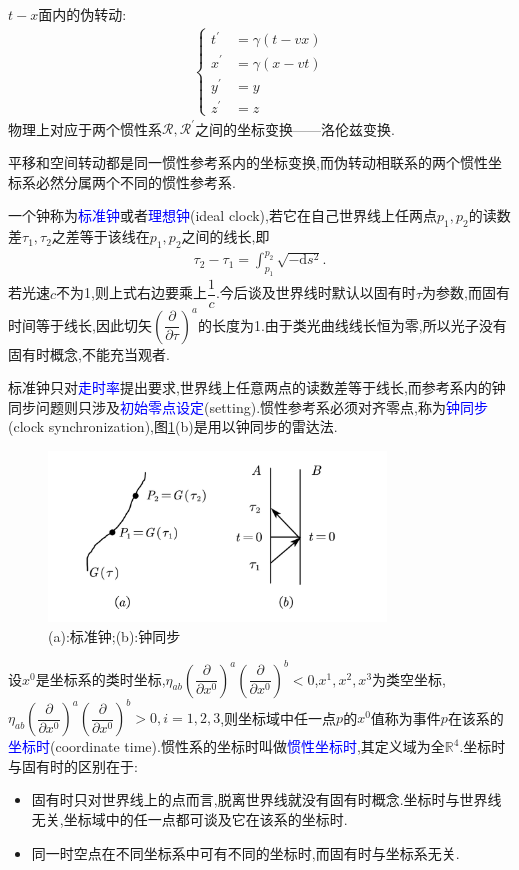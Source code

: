 \begin{enumerate}
$t-x$面内的伪转动:
\begin{align}
\left\{
\begin{aligned}
t^\prime &=\gamma(t-vx)\\
x^\prime&=\gamma(x-vt)\\
y^\prime&=y\\
z^\prime &=z
\end{aligned}
\right.
\end{align}
物理上对应于两个惯性系$\mathscr{R},\mathscr{R}^\prime$之间的坐标变换——洛伦兹变换.
\end{enumerate}

平移和空间转动都是同一惯性参考系内的坐标变换,而伪转动相联系的两个惯性坐标系必然分属两个不同的惯性参考系.

一个钟称为\textcolor{blue}{标准钟}或者\textcolor{blue}{理想钟}(ideal clock),若它在自己世界线上任两点$p_1,p_2$的读数差$\tau_1,\tau_2$之差等于该线在$p_1,p_2$之间的线长,即
\begin{align}
    \tau_2-\tau_1=\int_{p_1}^{p_2}\sqrt{-\text{d}s^2}.
\end{align}
若光速$c$不为1,则上式右边要乘上$\dfrac{1}{c}$.今后谈及世界线时默认以固有时$\tau$为参数,而固有时间等于线长,因此切矢$\left(\dfrac{\partial}{\partial \tau}\right)^a$的长度为1.由于类光曲线线长恒为零,所以光子没有固有时概念,不能充当观者.

标准钟只对\textcolor{blue}{走时率}提出要求,世界线上任意两点的读数差等于线长,而参考系内的钟同步问题则只涉及\textcolor{blue}{初始零点设定}(setting).惯性参考系必须对齐零点,称为\textcolor{blue}{钟同步}(clock synchronization),图\ref{fig:6-5}(b)是用以钟同步的雷达法.
\begin{figure}[htbp]
    \centering
 \includegraphics[width=0.8\textwidth]{Pictures/6-5.png}
    \caption{(a):标准钟;(b):钟同步}
    \label{fig:6-5}
\end{figure}

设$x^0$是坐标系的类时坐标,$\eta_{ab}\left(\dfrac{\partial}{\partial x^0}\right)^a\left(\dfrac{\partial}{\partial x^0}\right)^b<0$,$x^1,x^2,x^3$为类空坐标,$\eta_{ab}\left(\dfrac{\partial}{\partial x^0}\right)^a\left(\dfrac{\partial}{\partial x^0}\right)^b>0,i=1,2,3$,则坐标域中任一点$p$的$x^0$值称为事件$p$在该系的\textcolor{blue}{坐标时}(coordinate time).惯性系的坐标时叫做\textcolor{blue}{惯性坐标时},其定义域为全$\mathbb{R}^4$.坐标时与固有时的区别在于:
\begin{itemize}
    \item 固有时只对世界线上的点而言,脱离世界线就没有固有时概念.坐标时与世界线无关,坐标域中的任一点都可谈及它在该系的坐标时.
    \item 同一时空点在不同坐标系中可有不同的坐标时,而固有时与坐标系无关.
\end{itemize}

